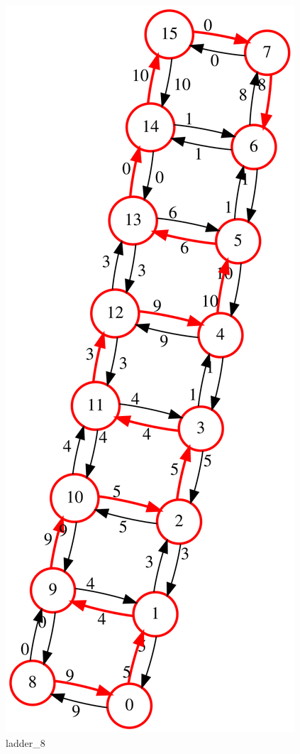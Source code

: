 \documentclass{article}
\begin{document}
\begin{figure}[H]
  \centering
  \includegraphics[scale=0.3]{graph/GST_ladder_8}
  \caption{ladder\_8}
\end{figure}
\end{document}
